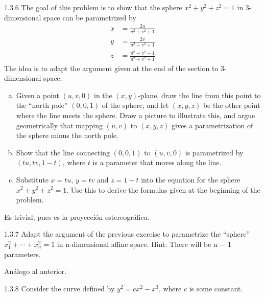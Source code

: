 \documentclass[twoside]{article}
\begin{document}
\newpage
\begin{ejercicio}{1.3.6}
The goal of this problem is to show that the sphere $x^2 + y^2 + z^2 = 1$ in $3$-dimensional space can be parametrized by
\begin{align*}
x&=\frac{2u}{u^2+v^2+1}\\
y&=\frac{2v}{u^2+v^2+1}\\
z&=\frac{u^2+v^2-1}{u^2+v^2+1}
\end{align*}
The idea is to adapt the argument given at the end of the section to 3-dimensional space.
\begin{enumerate}[a)]
\item Given a point $(u, v, 0)$ in the $(x, y)$-plane, draw the line from this point to the “north pole” $(0, 0, 1)$ of the sphere, and let $(x, y, z)$ be the other point where the line meets the sphere. Draw a picture to illustrate this, and argue geometrically that mapping
$(u, v)$ to $(x, y, z)$ gives a parametrization of the sphere minus the north pole.
\item Show that the line connecting $(0, 0, 1)$ to $(u, v, 0)$ is parametrized by $(tu, tv, 1 − t)$,
where $t$ is a parameter that moves along the line.
\item Substitute $x = tu$, $y = tv$ and $z = 1−t$ into the equation for the sphere $x^2+y^2+z^2 = 1$.
Use this to derive the formulas given at the beginning of the problem.
\end{enumerate}
\end{ejercicio}
\begin{solucion}
Es trivial, pues es la proyección estereográfica.
\end{solucion}

\newpage

\begin{ejercicio}{1.3.7} Adapt the argument of the previous exercise to parametrize the “sphere” $x^2_1
+\cdots+x^{2}_n = 1$ in n-dimensional affine space. Hint: There will be n − 1 parameters.
\end{ejercicio}
\begin{solucion}
Análogo al anterior.
\end{solucion}

\newpage

\begin{ejercicio}{1.3.8}
Consider the curve defined by $y^2 = cx^2 −x^3$, where $c$ is some constant.
\end{ejercicio}
\end{document}
